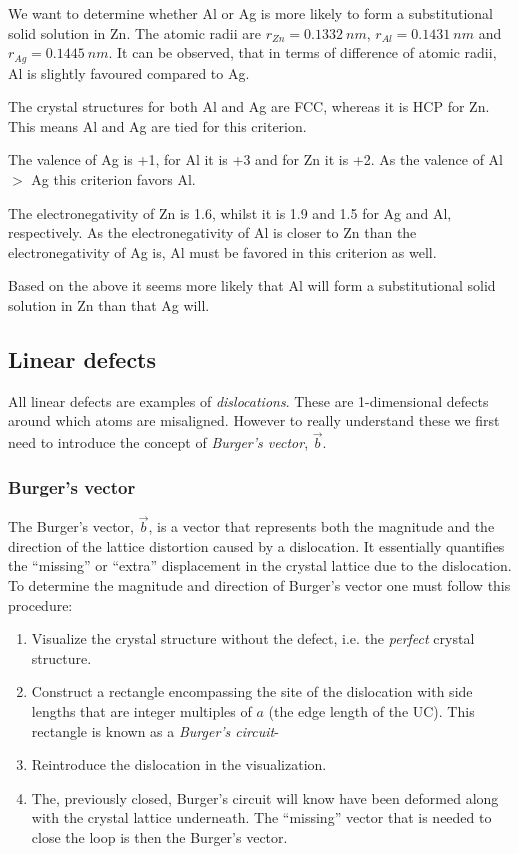 \begin{exa}
  We want to determine whether Al or Ag is more likely to form a substitutional solid solution in Zn.
  \bigbreak
  The atomic radii are $r_{Zn} = \qty{0,1332}{nm}$, $r_{Al} = \qty{0,1431}{nm}$ and $r_{Ag} = \qty{0,1445}{nm}$. It can be observed, that in terms of difference of atomic radii, Al is slightly favoured compared to Ag.

  The crystal structures for both Al and Ag are FCC, whereas it is HCP for Zn. This means Al and Ag are tied for this criterion.

The valence of Ag is +1, for Al it is +3 and for Zn it is +2. As the valence of Al $>$ Ag this criterion favors Al.

  The electronegativity of Zn is \num{1,6}, whilst it is \num{1,9} and \num{1,5} for Ag and Al, respectively. As the electronegativity of Al is closer to Zn than the electronegativity of Ag is, Al must be favored in this criterion as well.

  Based on the above it seems more likely that Al will form a substitutional solid solution in Zn than that Ag will.
\end{exa}

\subsection{Linear defects}
All linear defects are examples of \textit{dislocations}. These are 1-dimensional defects around which atoms are misaligned. However to really understand these we first need to introduce the concept of \textit{Burger's vector}, $\Vec{b}$.

\subsubsection{Burger's vector}
The Burger's vector, $\Vec{b}$, is a vector that represents both the magnitude and the direction of the lattice distortion caused by a dislocation. It essentially quantifies the ``missing'' or ``extra'' displacement in the crystal lattice due to the dislocation. To determine the magnitude and direction of Burger's vector one must follow this procedure:
\begin{enumerate}
  \item Visualize the crystal structure without the defect, i.e. the \textit{perfect} crystal structure.
  \item Construct a rectangle encompassing the site of the dislocation with side lengths that are integer multiples of $a$ (the edge length of the UC). This rectangle is known as a \textit{Burger's circuit}-
  \item Reintroduce the dislocation in the visualization.
  \item The, previously closed, Burger's circuit will know have been deformed along with the crystal lattice underneath. The ``missing'' vector that is needed to close the loop is then the Burger's vector.
\end{enumerate}

